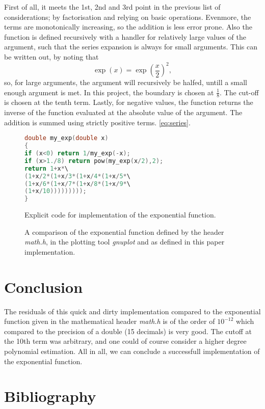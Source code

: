 \documentclass[a4paper, twocolumn, 11pt, oneside]{memoir}
\begin{document}
First of all, it meets the 1st, 2nd and 3rd point in the previous list of considerations; 
by factorisation and relying on basic operations. Evenmore, the terms
are monotonically increasing, so the addition
is less error prone. Also the function is defined recursively with a handler for relatively large
values of the argument, such that the series expansion is always for small
arguments. This can be written out, by noting that
\begin{equation}
  \exp(x) = \exp\left(\frac{x}{2}\right)^2, %
\end{equation}
so, for large arguments, the argument will recursively be halfed, untill a
small enough argument is met. In this project, the boundary is chosen at
$\frac{1}{8}$. The cut-off is chosen at the tenth term.
Lastly, for negative values, the function returns the inverse of the
function evaluated at the absolute value of the argument. The addition is summed using strictly
positive terms.
\cref{eq:series}.
\begin{figure}[b]
\begin{lstlisting}[language=c]
double my_exp(double x)
{
if (x<0) return 1/my_exp(-x);
if (x>1./8) return pow(my_exp(x/2),2);
return 1+x*\
(1+x/2*(1+x/3*(1+x/4*(1+x/5*\
(1+x/6*(1+x/7*(1+x/8*(1+x/9*\
(1+x/10)))))))));
}
\end{lstlisting}
\caption{Explicit code for implementation of the exponential function.}
\label{fig:code}
\end{figure}

\begin{figure}[ht]
\centering

\caption{A comparison of the exponential function defined by the header
\textsl{math.h}, in the plotting tool \textsl{gnuplot} and as defined in this
paper implementation.}
\label{fig:exp.tex}
\end{figure}

\newpage
\section{Conclusion}
The residuals of this quick and dirty implementation compared to the
exponential function given in the mathematical header \textsl{math.h} is of the
order of $10^{-12}$ which compared to the precision of a double (15 decimals)
is very good. The cutoff at the 10th term was arbitrary, and one could of
course consider a higher degree polynomial estimation. All in all, we
can conclude a successfull implementation of the exponential function.

\section{Bibliography}
\printbibliography[heading=none]
\nocite{*}
\end{document}
